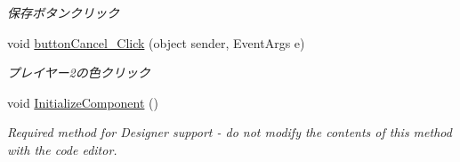 \begin{DoxyCompactItemize}
\begin{DoxyCompactList}\small\item\em 保存ボタンクリック \end{DoxyCompactList}\item 
void \hyperlink{class_reversi_form_1_1_setting_form_a1f030516cd37c000ba931af26be38903}{button\+Cancel\+\_\+\+Click} (object sender, Event\+Args e)
\begin{DoxyCompactList}\small\item\em プレイヤー2の色クリック \end{DoxyCompactList}\item 
void \hyperlink{class_reversi_form_1_1_setting_form_a9b663029f37a28044ff2300fc66dc859}{Initialize\+Component} ()
\begin{DoxyCompactList}\small\item\em Required method for Designer support -\/ do not modify the contents of this method with the code editor. \end{DoxyCompactList}\end{DoxyCompactItemize}
